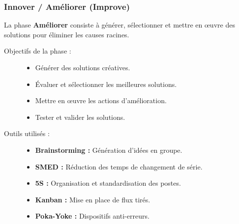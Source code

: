 \documentclass[a4paper,12pt]{article}
\begin{document}
\subsubsection{Innover / Améliorer (Improve)}

La phase \textbf{Améliorer} consiste à générer, sélectionner et mettre en œuvre des solutions pour éliminer les causes racines.

\begin{description}
    \item[Objectifs de la phase :]
    \begin{itemize}
        \item Générer des solutions créatives.
        \item Évaluer et sélectionner les meilleures solutions.
        \item Mettre en œuvre les actions d'amélioration.
        \item Tester et valider les solutions.
    \end{itemize}
    
    \item[Outils utilisés :]
    \begin{itemize}
        \item \textbf{Brainstorming :} Génération d'idées en groupe.
        \item \textbf{SMED :} Réduction des temps de changement de série.
        \item \textbf{5S :} Organisation et standardisation des postes.
        \item \textbf{Kanban :} Mise en place de flux tirés.
        \item \textbf{Poka-Yoke :} Dispositifs anti-erreurs.
    \end{itemize}
\end{description}

\begin{center}
\end{center}
\end{document}

